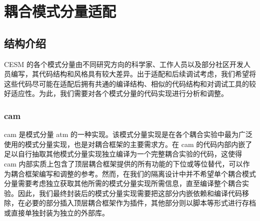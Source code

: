 \chapter{耦合模式分量适配}
\label{cha:refactor}

\section{结构介绍}

CESM 的各个模式分量由不同研究方向的科学家、工作人员以及部分社区开发人员编写，其代码结构和风格具有较大差异。出于适配和后续调试考虑，我们希望将这些代码尽可能在适配后拥有共通的编译结构、相似的代码结构和对调试工具的较好适应性。为此，我们需要对各个模式分量的代码实现进行分析和调整。

\subsection{cam}

cam 是模式分量 atm 的一种实现。该模式分量实现是在各个耦合实验中最为广泛使用的模式分量实现，也是对耦合框架的主要需求方。在 cam 的代码内部内嵌了足以自行抽取其他模式分量实现独立编译为一个完整耦合实验的代码，这使得 cam 内部实质上包含了顶层耦合框架提供的所有功能的下位或等位替代，可以作为耦合框架编写和调整的参考。然而，在我们的隔离设计中并不希望单个耦合模式分量需要考虑独立获取其他所需的模式分量实现所需信息，直至编译整个耦合实验。因此，我们最终封装后的模式分量实现需要把这部分内嵌依赖和编译代码移除，在必要的部分插入顶层耦合框架作为插件，其他部分则以脚本等形式进行存档或直接单独封装为独立的外部库。

